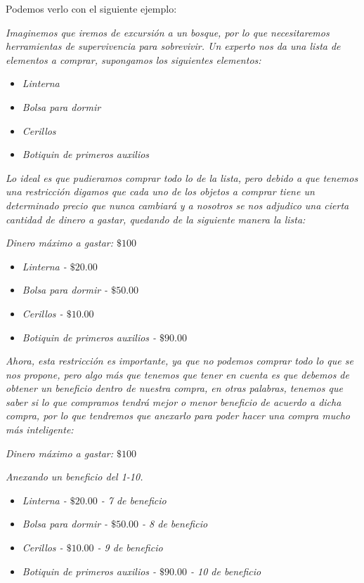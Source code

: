 \documentclass{article}
\begin{document}
Podemos verlo con el siguiente ejemplo:

\textit{Imaginemos que iremos de excursión a un bosque, por lo que necesitaremos herramientas de supervivencia para sobrevivir. Un experto nos da una lista de elementos a comprar, supongamos los siguientes elementos:}

\begin{itemize}
	\item \textit{Linterna}
	\item \textit{Bolsa para dormir}
	\item \textit{Cerillos}
	\item \textit{Botiquin de primeros auxilios}
\end{itemize}

\textit{Lo ideal es que pudieramos comprar todo lo de la lista, pero debido a que tenemos una restricción digamos que cada uno de los objetos a comprar tiene un determinado precio que nunca cambiará y a nosotros se nos adjudico una cierta cantidad de dinero a gastar, quedando de la siguiente manera la lista:}

\textit{Dinero máximo a gastar: $\$100$}
\begin{itemize}
	\item \textit{Linterna - $\$20.00$}
	\item \textit{Bolsa para dormir - $\$50.00$}
	\item \textit{Cerillos - $\$10.00$}
	\item \textit{Botiquin de primeros auxilios - $\$90.00$}
\end{itemize}

\textit{Ahora, esta restricción es importante, ya que no podemos comprar todo lo que se nos propone, pero algo más que tenemos que tener en cuenta es que debemos de obtener un beneficio dentro de nuestra compra, en otras palabras, tenemos que saber si lo que compramos tendrá mejor o menor beneficio de acuerdo a dicha compra, por lo que tendremos que anexarlo para poder hacer una compra mucho más inteligente:}

\textit{Dinero máximo a gastar: $\$100$}

\textit{Anexando un beneficio del 1-10.}
\begin{itemize}
	\item \textit{Linterna - $\$20.00$ - 7 de beneficio}
	\item \textit{Bolsa para dormir - $\$50.00$ - 8 de beneficio}
	\item \textit{Cerillos - $\$10.00$ - 9 de beneficio}
	\item \textit{Botiquin de primeros auxilios - $\$90.00$ - 10 de beneficio}
\end{itemize}
\end{document}
